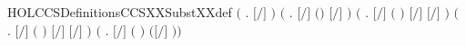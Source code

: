 \begin{SaveVerbatim}{HOLCCSDefinitionsCCSXXSubstXXdef}
\HOLTokenTurnstile{} \ensuremath{(}\HOLSymConst{\HOLTokenForall{}} . \ensuremath{[}\ensuremath{/}\ensuremath{]}  \HOLSymConst{\ensuremath{=}} \ensuremath{)} \HOLSymConst{\HOLTokenConj{}}
   \ensuremath{(}\HOLSymConst{\HOLTokenForall{}}   . \ensuremath{[}\ensuremath{/}\ensuremath{]} \ensuremath{(}\HOLSymConst{\ensuremath{\ldotp}}\ensuremath{)} \HOLSymConst{\ensuremath{=}} \HOLSymConst{\ensuremath{\ldotp}}\ensuremath{[}\ensuremath{/}\ensuremath{]} \ensuremath{)} \HOLSymConst{\HOLTokenConj{}}
   \ensuremath{(}\HOLSymConst{\HOLTokenForall{}}   . \ensuremath{[}\ensuremath{/}\ensuremath{]} \ensuremath{(} \HOLSymConst{\ensuremath{+}} \ensuremath{)} \HOLSymConst{\ensuremath{=}} \ensuremath{[}\ensuremath{/}\ensuremath{]}  \HOLSymConst{\ensuremath{+}} \ensuremath{[}\ensuremath{/}\ensuremath{]} \ensuremath{)} \HOLSymConst{\HOLTokenConj{}}
   \ensuremath{(}\HOLSymConst{\HOLTokenForall{}}   . \ensuremath{[}\ensuremath{/}\ensuremath{]} \ensuremath{(} \HOLSymConst{\ensuremath{\mid}} \ensuremath{)} \HOLSymConst{\ensuremath{=}} \ensuremath{[}\ensuremath{/}\ensuremath{]}  \HOLSymConst{\ensuremath{\mid}} \ensuremath{[}\ensuremath{/}\ensuremath{]} \ensuremath{)} \HOLSymConst{\HOLTokenConj{}}
   \ensuremath{(}\HOLSymConst{\HOLTokenForall{}}   . \ensuremath{[}\ensuremath{/}\ensuremath{]} \ensuremath{(}  \ensuremath{)} \HOLSymConst{\ensuremath{=}}   \ensuremath{(}\ensuremath{[}\ensuremath{/}\ensuremath{]} \ensuremath{)}\ensuremath{)} \HOLSymConst{\HOLTokenConj{}}

\end{SaveVerbatim}
